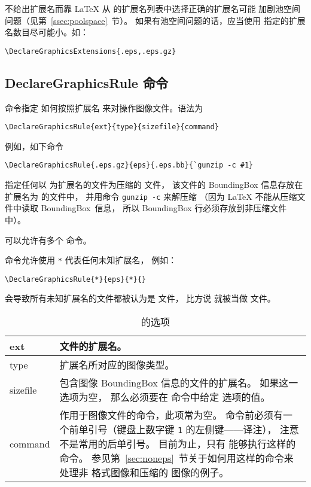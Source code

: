 不给出扩展名而靠 \LaTeX{} 从  的扩展名列表中选择正确的扩展名可能
加剧池空间问题（见第~\ref{ssec:poolspace}~节）。
如果有池空间问题的话，应当使用  指定的扩展名数目尽可能小。如：
\begin{lstlisting}
\DeclareGraphicsExtensions{.eps,.eps.gz}
\end{lstlisting}


\subsection{DeclareGraphicsRule 命令}\label{ssec:derule}
 命令指定  如何按照扩展名
来对操作图像文件。语法为
\begin{lstlisting}
\DeclareGraphicsRule{ext}{type}{sizefile}{command}
\end{lstlisting}
例如，如下命令
\begin{lstlisting}
\DeclareGraphicsRule{.eps.gz}{eps}{.eps.bb}{`gunzip -c #1}
\end{lstlisting}
指定任何以  为扩展名的文件为压缩的 文件，
该文件的 BoundingBox 信息存放在扩展名为  的文件中，
并用命令 \texttt{gunzip -c} 来解压缩
（因为 \LaTeX{} 不能从压缩文件中读取 BoundingBox~信息，
所以 BoundingBox 行必须存放到非压缩文件中）。

可以允许有多个  命令。

 命令允许使用 \texttt{*} 代表任何未知扩展名，
例如：
\begin{lstlisting}
\DeclareGraphicsRule{*}{eps}{*}{}
\end{lstlisting}
会导致所有未知扩展名的文件都被认为是  文件，
比方说  就被当做 文件。

\begin{table}
	\centering
	\caption{ 的选项}\label{tab:DeclaregruleArgs}
	\kaishu 
	\begin{tabular}{>{\ttfamily}l  P{0.7\textwidth}}
		\toprule
		ext & 文件的扩展名。 \\ \hline
		type & 扩展名所对应的图像类型。 \\ \hline
		sizefile & 包含图像 BoundingBox 信息的文件的扩展名。
		如果这一选项为空，
		那么必须要在  命令中给定  选项的值。 \\ \hline
		command & 作用于图像文件的命令，此项常为空。
		命令前必须有一个前单引号（键盘上数字键 \texttt{1} 的左侧键——译注），
		注意不是常用的后单引号。
		目前为止，只有  能够执行这样的命令。
		参见第~\ref{sec:noneps}~节关于如何用这样的命令来处理非  格式图像和压缩的  图像的例子。\\
		\bottomrule
	\end{tabular}
\end{table}

